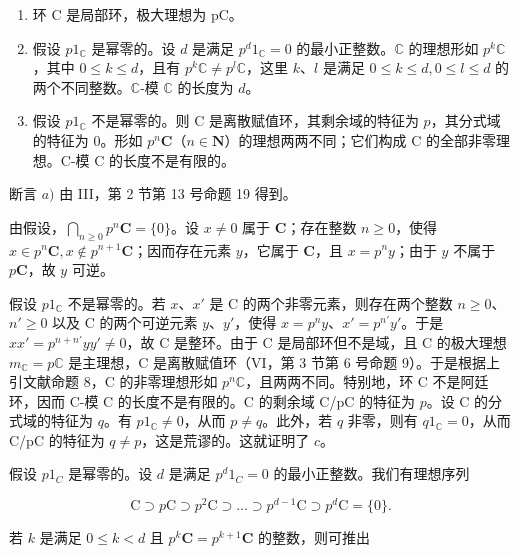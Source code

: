 \begin{enumerate}
\def\labelenumi{\alph{enumi})}
\item
  环 C 是局部环，极大理想为 pC。
\item
  假设 \(p1_{\mathbb{C}}\) 是幂零的。设 \(d\) 是满足 \(p^{d}1_{\mathbb{C}} = 0\) 的最小正整数。\(\mathbb{C}\) 的理想形如 \(p^{k}\mathbb{C}\)，其中 \(0 \leqslant k \leqslant d\)，且有 \(p^{k}\mathbb{C} \neq p^{l}\mathbb{C}\)，这里 \(k\)、\(l\) 是满足 \(0 \leqslant k \leqslant d, 0 \leqslant l \leqslant d\) 的两个不同整数。\(\mathbb{C}\)-模 \(\mathbb{C}\) 的长度为 \(d\)。
\item
  假设 \(p1_{\mathbb{C}}\) 不是幂零的。则 C 是离散赋值环，其剩余域的特征为 \(p\)，其分式域的特征为 0。形如 \(p^{n}\mathbf{C}\)（\(n \in \mathbf{N}\)）的理想两两不同；它们构成 C 的全部非零理想。C-模 C 的长度不是有限的。
\end{enumerate}

断言 \(a)\) 由 III，第 2 节第 13 号命题 19 得到。

由假设，\(\bigcap_{n\geqslant 0}p^{n}\mathbf{C} = \{0\}\)。设 \(x\neq 0\) 属于 \(\mathbf{C}\)；存在整数 \(n\geqslant 0\)，使得 \(x\in p^n\mathbf{C}, x\notin p^{n + 1}\mathbf{C}\)；因而存在元素 \(y\)，它属于 \(\mathbf{C}\)，且 \(x = p^n y\)；由于 \(y\) 不属于 \(p\mathbf{C}\)，故 \(y\) 可逆。

假设 \(p1_{\mathbb{C}}\) 不是幂零的。若 \(x\)、\(x'\) 是 C 的两个非零元素，则存在两个整数 \(n \geqslant 0\)、\(n' \geqslant 0\) 以及 C 的两个可逆元素 \(y\)、\(y'\)，使得 \(x = p^n y\)、\(x' = p^{n'} y'\)。于是 \(xx' = p^{n+n'} yy' \neq 0\)，故 C 是整环。由于 C 是局部环但不是域，且 C 的极大理想 \(m_{\mathbb{C}} = p\mathbb{C}\) 是主理想，C 是离散赋值环（VI，第 3 节第 6 号命题 9）。于是根据上引文献命题 8，C 的非零理想形如 \(p^n\mathbb{C}\)，且两两不同。特别地，环 C 不是阿廷环，因而 C-模 C 的长度不是有限的。C 的剩余域 C/pC 的特征为 \(p\)。设 C 的分式域的特征为 \(q\)。有 \(p1_{\mathbb{C}} \neq 0\)，从而 \(p \neq q\)。此外，若 \(q\) 非零，则有 \(q1_{\mathbb{C}} = 0\)，从而 C/pC 的特征为 \(q \neq p\)，这是荒谬的。这就证明了 \(c\)。

假设 \(p1_{C}\) 是幂零的。设 \(d\) 是满足 \(p^{d}1_{C} = 0\) 的最小正整数。我们有理想序列

\[
\mathrm{C} \supset p \mathrm{C} \supset p ^ {2} \mathrm{C} \supset \dots \supset p ^ {d - 1} \mathrm{C} \supset p ^ {d} \mathrm{C} = \{0 \}.\tag{E}
\]

若 \(k\) 是满足 \(0 \leqslant k < d\) 且 \(p^k\mathbf{C} = p^{k+1}\mathbf{C}\) 的整数，则可推出

